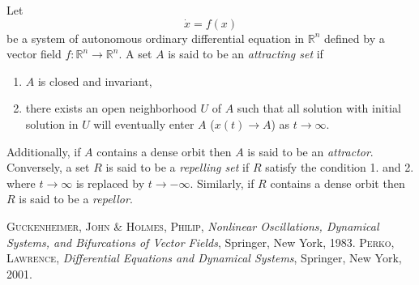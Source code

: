 \documentclass[12pt]{article}
\begin{document}
Let
$$\dot{x}=f(x)$$
be a system of autonomous ordinary differential equation in $\mathbb{R}^n$ defined by a vector field $f\colon \mathbb{R}^n\to \mathbb{R}^n$.
A set $A$ is said to be an \emph{attracting set}\cite{GH,P} if
\begin{enumerate}
\item $A$ is closed and invariant,
\item there exists an open neighborhood $U$ of $A$ such that all solution 
with initial solution in $U$ will eventually enter $A$ ($x(t)\to A$) as $t\to \infty$. 
\end{enumerate}
Additionally, if $A$ contains a dense orbit then $A$ is said to be an \emph{attractor}\cite{GH,P}.\\
Conversely, a set $R$ is said to be a \emph{repelling set}\cite{GH} if $R$ satisfy the condition 1. and  2. where $t\to \infty$ is replaced by $t\to -\infty$.  Similarly, if $R$ contains a dense orbit then $R$ is said to be a \emph{repellor}\cite{GH}.

\begin{thebibliography}{1}
{\scshape Guckenheimer, John \& Holmes, Philip},
\emph{Nonlinear Oscillations, Dynamical Systems, 
and Bifurcations of Vector Fields}, 
Springer, New York, 1983.
{\scshape Perko, Lawrence},
\emph{Differential Equations and Dynamical Systems}, 
Springer, New York, 2001.
\end{thebibliography}
\end{document}
